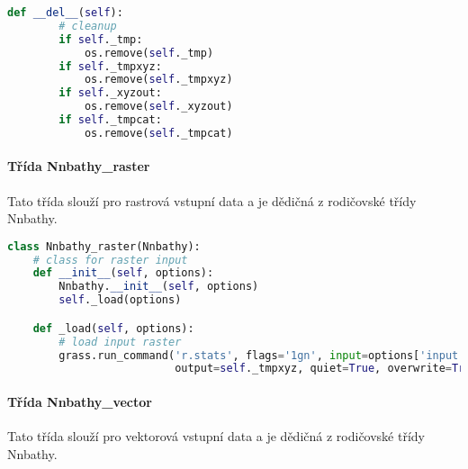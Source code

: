 \documentclass[12pt,a4paper]{article}
\begin{document}
\begin{lstlisting}[language=python,caption={python version}]
    def __del__(self):
        # cleanup
        if self._tmp:
            os.remove(self._tmp)
        if self._tmpxyz:
            os.remove(self._tmpxyz)
        if self._xyzout:
            os.remove(self._xyzout)
        if self._tmpcat:
            os.remove(self._tmpcat)
\end{lstlisting}

\paragraph{Třída Nnbathy\_raster}
Tato třída slouží pro rastrová vstupní data a je dědičná z rodičovské třídy Nnbathy.

\begin{lstlisting}[language=python,caption={python version}]
class Nnbathy_raster(Nnbathy):
    # class for raster input
    def __init__(self, options):
        Nnbathy.__init__(self, options)
        self._load(options)

    def _load(self, options):
        # load input raster
        grass.run_command('r.stats', flags='1gn', input=options['input'],
                          output=self._tmpxyz, quiet=True, overwrite=True)
\end{lstlisting}

\paragraph{Třída Nnbathy\_vector}
Tato třída slouží pro vektorová vstupní data a je dědičná z rodičovské třídy Nnbathy.
\end{document}
